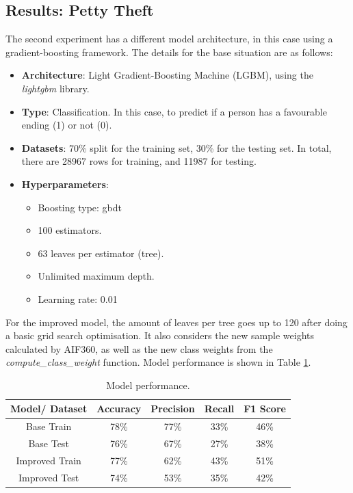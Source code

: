 \documentclass[twoside,11pt]{article}
\begin{document}
\subsection{Results: Petty Theft}

The second experiment has a different model architecture, in this case using a gradient-boosting framework. The details for the base situation are as follows:

\begin{itemize}
    \item \textbf{Architecture}: Light Gradient-Boosting Machine (LGBM), using the \textit{lightgbm} library.
    \item \textbf{Type}: Classification. In this case, to predict if a person has a favourable ending (1) or not (0).
    \item \textbf{Datasets}: 70\% split for the training set, 30\% for the testing set. In total, there are 28967 rows for training, and 11987 for testing.
    \item \textbf{Hyperparameters}:
        \begin{itemize}
            \item Boosting type: gbdt
            \item 100 estimators.
            \item 63 leaves per estimator (tree).
            \item Unlimited maximum depth.
            \item Learning rate: 0.01
        \end{itemize}
\end{itemize}

For the improved model, the amount of leaves per tree goes up to 120 after doing a basic grid search optimisation. It also considers the new sample weights calculated by AIF360, as well as the new class weights from the \textit{compute\_class\_weight} function. Model performance is shown in Table \ref{tab_perf_hfalta:}.

\begin{table}[!htb]
\centering
\begin{tabular}{|c|c|c|c|c|}
\hline
        \textbf{Model/ Dataset} & \textbf{Accuracy} & \textbf{Precision} & \textbf{Recall} & \textbf{F1 Score} \\ \hline
        
        Base Train & 78\% & 77\% & 33\% & 46\% \\ 
        Base Test & 76\% & 67\% & 27\% & 38\% \\ 
        Improved Train & 77\% & 62\% & 43\% & 51\% \\ 
        Improved Test & 74\% & 53\% & 35\% & 42\% \\ 
        \hline

    \end{tabular}
\caption{Model performance.}
\label{tab_perf_hfalta:}
\end{table}
\end{document}
